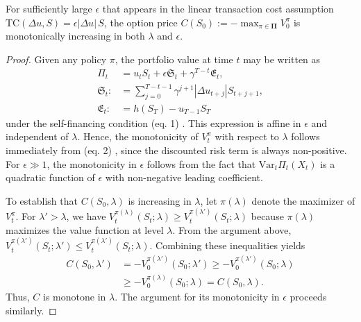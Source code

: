 \begin{prop}
For sufficiently large $\epsilon$ that appears in the linear transaction cost assumption $\text{TC}(\Delta u, S)=\epsilon|\Delta u| \,S$, the option price $C(S_0) := -\max_{\pi\in\mathbf{\Pi}} V_0^\pi$ is monotonically increasing in both $\lambda$ and $\epsilon$.
\label{prop:qlbs-monotone}
\end{prop}
\begin{proof}
Given any policy $\pi$, the portfolio value at time $t$ may be written as
\begin{align}
\Pi_t &= u_t  S_t + \epsilon \mathfrak{S}_t + \gamma^{T-t} \mathfrak{E}_t, \label{eq:qlbs-proof-port-value} \\
\mathfrak{S}_t :&= \sum_{j=0}^{T-t-1} \gamma^{j+1} |\Delta u_{t+j}| S_{t+j+1}, \nonumber \\
\mathfrak{E}_t :&= h(S_T) - u_{T-1}S_T \nonumber
\end{align}
under the self-financing condition
(eq. 1)
.
This expression is affine in $\epsilon$ and independent of $\lambda$.
Hence, the monotonicity of $V_t^\pi$ with respect to  $\lambda$ follows immediately from
(eq. 2)
, since the discounted risk term is always non-positive.
For $\epsilon\gg1$, the monotonicity in $\epsilon$ follows from the fact that $\text{Var}_t\Pi_{t}\left(X_{t}\right)$ is a quadratic function of $\epsilon$ with non-negative leading coefficient.

To establish that $C(S_0,\lambda)$ is increasing in $\lambda$, let $\pi(\lambda)$ denote the maximizer of $V_t^\pi$.
For $\lambda ' > \lambda$, we have
$V_t^{\pi(\lambda )}(S_t;\lambda) \ge V_t^{\pi(\lambda')}(S_t;\lambda)$
because $\pi(\lambda)$  maximizes the value function at level $\lambda$.
From the argument above, $V_t^{\pi(\lambda')}(S_t;\lambda') \le V_t^{\pi(\lambda')}(S_t;\lambda)$.
Combining these inequalities yields
\begin{align*}
C(S_0,\lambda') &= -V_0^{\pi(\lambda')} (S_0;\lambda') \ge -V_0^{\pi(\lambda')} (S_0;\lambda) \\
&\ge -V_0^{\pi(\lambda)} (S_0;\lambda) = C(S_0,\lambda) .
\end{align*}
Thus, $C$ is monotone in $\lambda$.
The argument for its monotonicity in $\epsilon$ proceeds similarly.


\end{proof}
